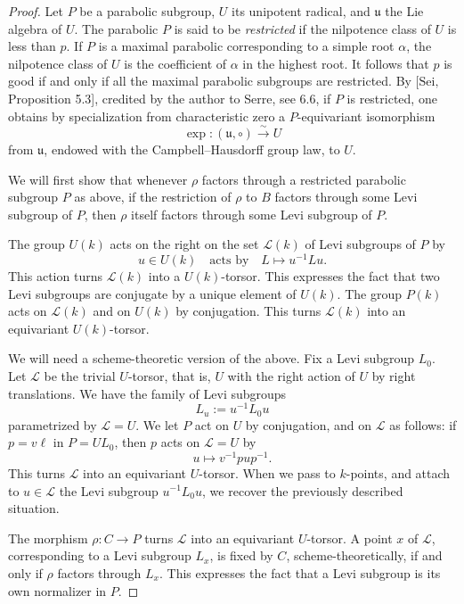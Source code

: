 \documentclass[11pt]{article}
\begin{document}
\begin{proof}
Let \(P\) be a parabolic subgroup, \(U\) its unipotent radical, and
\(\mathfrak u\) the Lie algebra of \(U\). The parabolic \(P\) is said to be
\emph{restricted} if the nilpotence class of \(U\) is less than \(p\). If
\(P\) is a maximal parabolic corresponding to a simple root \(\alpha\), the
nilpotence class of \(U\) is the coefficient of \(\alpha\) in the highest root.
It follows that \(p\) is good if and only if all the maximal parabolic subgroups
are restricted. By \([\mathrm{Sei},\) Proposition 5.3], credited by the author
to Serre, see 6.6, if \(P\) is restricted, one obtains by specialization from
characteristic zero a \(P\)-equivariant isomorphism
\begin{equation}
  \exp:(\mathfrak u,\circ)\xrightarrow{\sim} U
  \tag{4.2.2}
\end{equation}
from \(\mathfrak u\), endowed with the Campbell--Hausdorff group law, to \(U\).

We will first show that whenever \(\rho\) factors through a restricted parabolic
subgroup \(P\) as above, if the restriction of \(\rho\) to \(B\) factors through
some Levi subgroup of \(P\), then \(\rho\) itself factors through some Levi
subgroup of \(P\).

The group \(U(k)\) acts on the right on the set \(\mathcal L(k)\) of Levi
subgroups of \(P\) by
\[
  u\in U(k) \quad\text{acts by}\quad L\longmapsto u^{-1}Lu.
\]
This action turns \(\mathcal L(k)\) into a \(U(k)\)-torsor. This expresses the
fact that two Levi subgroups are conjugate by a unique element of \(U(k)\). The
group \(P(k)\) acts on \(\mathcal L(k)\) and on \(U(k)\) by conjugation. This
turns \(\mathcal L(k)\) into an equivariant \(U(k)\)-torsor.

We will need a scheme-theoretic version of the above. Fix a Levi subgroup
\(L_0\). Let \(\mathcal L\) be the trivial \(U\)-torsor, that is, \(U\) with the
right action of \(U\) by right translations. We have the family of Levi subgroups
\[
  L_u:=u^{-1}L_0u
\]
parametrized by \(\mathcal L=U\). We let \(P\) act on \(U\) by conjugation, and
on \(\mathcal L\) as follows: if \(p=v\ell\) in \(P=U L_0\), then \(p\) acts on
\(\mathcal L=U\) by
\[
  u\longmapsto v^{-1}pup^{-1}.
\]
This turns \(\mathcal L\) into an equivariant \(U\)-torsor. When we pass to
\(k\)-points, and attach to \(u\in\mathcal L\) the Levi subgroup \(u^{-1}L_0u\),
we recover the previously described situation.

The morphism \(\rho:C\to P\) turns \(\mathcal L\) into an equivariant
\(U\)-torsor. A point \(x\) of \(\mathcal L\), corresponding to a Levi subgroup
\(L_x\), is fixed by \(C\), scheme-theoretically, if and only if \(\rho\) factors
through \(L_x\). This expresses the fact that a Levi subgroup is its own normalizer
in \(P\).


\end{proof}
\end{document}

